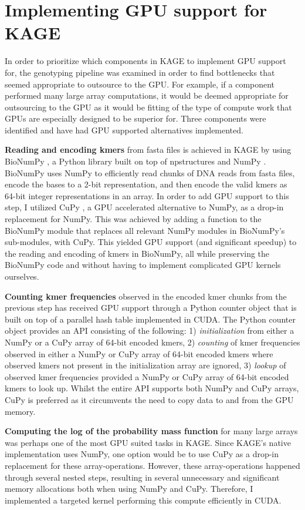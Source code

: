 \section*{Implementing GPU support for KAGE}\label{impl}
In order to prioritize which components in KAGE to implement GPU support for, the genotyping pipeline was examined in order to find bottlenecks that seemed appropriate to outsource to the GPU.
For example, if a component performed many large array computations, it would be deemed appropriate for outsourcing to the GPU as it would be fitting of the type of compute work that GPUs are especially designed to be superior for.
Three components were identified and have had GPU supported alternatives implemented.

\textbf{Reading and encoding kmers} from fasta files is achieved in KAGE by using BioNumPy \cite{bionumpy}, a Python library built on top of npstructures \cite{npstructures} and NumPy \cite{numpy}.
BioNumPy uses NumPy to efficiently read chunks of DNA reads from fasta files, encode the bases to a 2-bit representation, and then encode the valid kmers as 64-bit integer representations in an array.
In order to add GPU support to this step, I utilized CuPy \cite{cupy}, a GPU accelerated alternative to NumPy, as a drop-in replacement for NumPy.
This was achieved by adding a function to the BioNumPy module that replaces all relevant NumPy modules in BioNumPy's sub-modules, with CuPy.
This yielded GPU support (and significant speedup) to the reading and encoding of kmers in BioNumPy, all while preserving the BioNumPy code and without having to implement complicated GPU kernels ourselves.

\textbf{Counting kmer frequencies} observed in the encoded kmer chunks from the previous step has received GPU support through a Python counter object that is built on top of a parallel hash table implemented in CUDA.
The Python counter object provides an API consisting of the following:
1) \textit{initialization} from either a NumPy or a CuPy array of 64-bit encoded kmers,
2) \textit{counting} of kmer frequencies observed in either a NumPy or CuPy array of 64-bit encoded kmers where observed kmers not present in the initialization array are ignored,
3) \textit{lookup} of observed kmer frequencies provided a NumPy or CuPy array of 64-bit encoded kmers to look up.
Whilst the entire API supports both NumPy and CuPy arrays, CuPy is preferred as it circumvents the need to copy data to and from the GPU memory.

\textbf{Computing the log of the probability mass function} for many large arrays was perhaps one of the most GPU suited tasks in KAGE.
Since KAGE's native implementation uses NumPy, one option would be to use CuPy as a drop-in replacement for these array-operations. 
However, these array-operations happened through several nested steps, resulting in several unnecessary and significant memory allocations both when using NumPy and CuPy.
Therefore, I implemented a targeted kernel performing this compute efficiently in CUDA.

